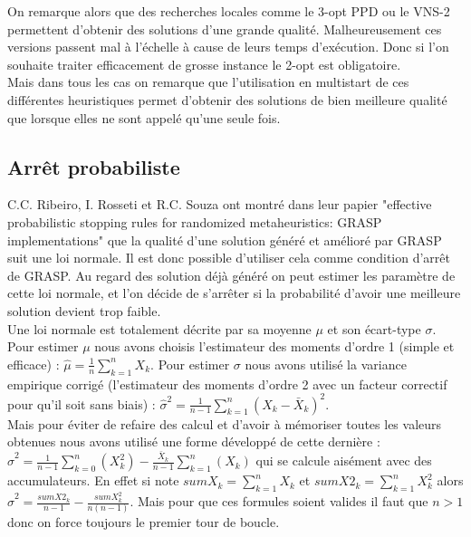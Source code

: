 \documentclass[12pt,a4paper]{article}
\begin{document}
On remarque alors que des recherches locales comme le 3-opt PPD ou le VNS-2 permettent d'obtenir des solutions d'une grande qualité. Malheureusement ces versions passent mal à l’échelle à cause de leurs temps d’exécution. Donc si l'on souhaite traiter efficacement de grosse instance le 2-opt est obligatoire.\\

Mais dans tous les cas on remarque que l'utilisation en multistart de ces différentes heuristiques permet d'obtenir des solutions de bien meilleure qualité que lorsque elles ne sont appelé qu'une seule fois.\\

\subsection{Arrêt probabiliste}

C.C. Ribeiro, I. Rosseti et R.C. Souza ont montré dans leur papier "effective probabilistic stopping rules for randomized metaheuristics: GRASP implementations" que la qualité d'une solution généré et amélioré par GRASP suit une loi normale. Il est donc possible d'utiliser cela comme condition d’arrêt de GRASP. Au regard des solution déjà généré on peut estimer les paramètre de cette loi normale, et l'on décide de s’arrêter si la probabilité d'avoir une meilleure solution devient trop faible.\\

Une loi normale est totalement décrite par sa moyenne $\mu$ et son écart-type $\sigma$. Pour estimer $\mu$ nous avons choisis l’estimateur des moments d'ordre 1 (simple et efficace) : $\widehat{\mu} = \frac{1}{n} \sum \limits_{k = 1} ^{n} X_k$. Pour estimer $\sigma$ nous avons utilisé la variance empirique corrigé (l'estimateur des moments d'ordre 2 avec un facteur correctif pour qu'il soit sans biais) : $\widehat{\sigma}^2 = \frac{1}{n-1} \sum \limits_{k = 1} ^{n} \left( X_k - \bar{X}_k \right) ^2$.\\
Mais pour éviter de refaire des calcul et d'avoir à mémoriser toutes les valeurs obtenues nous avons utilisé une forme développé de cette dernière : $\widehat{\sigma}^2 = \frac{1}{n-1} \sum \limits_{k=0} ^n \left( X_k ^2 \right) - \frac{ \bar{X}_k }{n-1} \sum \limits_{k=1} ^{n} \left( X_k \right)$ qui se calcule aisément avec des accumulateurs. En effet si note $sumX_k = \sum \limits_{k=1} ^{n} X_k$ et $sumX2_{k} = \sum \limits_{k=1} ^{n} X_k ^2$ alors $\widehat{\sigma}^2 = \frac{sumX2_k}{n-1} - \frac{sumX_k ^2}{n(n-1)}$. Mais pour que ces formules soient valides il faut que $n > 1$ donc on force toujours le premier tour de boucle.\\
\end{document}
